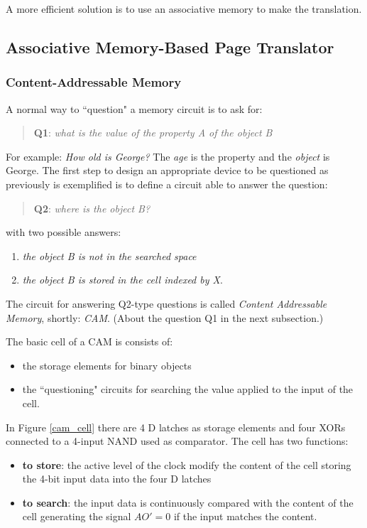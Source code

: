 A more efficient solution is to use an associative memory to make the translation.

\subsection{Associative Memory-Based Page Translator}

\subsubsection{Content-Addressable Memory}


A normal way to ``question" a memory circuit is to ask for:
\begin{quote}
{\bf Q1}: {\em what is the value of the property A of the object B}
\end{quote}
For example: {\em How old is George?} The {\em age} is the
property and the {\em object} is George. The first step to design
an appropriate device to be questioned as previously is
exemplified is to define a circuit able to answer the question:
\begin{quote}
{\bf Q2}: {\em where is the object B?}
\end{quote}
with two possible answers:
\begin{enumerate}
    \item {\em the object B is not in the searched space}
    \item {\em the object B is stored in the cell indexed by X}.
\end{enumerate}
The circuit for answering Q2-type questions is called {\em Content
Addressable Memory}, shortly: {\em CAM}. (About the question Q1 in
the next subsection.)

The basic cell of a CAM is consists of:
\begin{itemize}
    \item the storage elements for binary objects
    \item the ``questioning" circuits for searching the value
    applied to the input of the cell.
\end{itemize}


In Figure \ref{cam_cell} there are 4 D latches as storage elements
and four XORs connected to a 4-input NAND used as comparator. The
cell has two functions:
\begin{itemize}
    \item {\bf to store}: the active level of the clock modify the content
    of the cell storing  the 4-bit input data into the four D
    latches
    \item {\bf to search}: the input data is continuously compared
    with the content of the cell generating the signal $AO'=0$ if
    the input matches the content.
\end{itemize}




